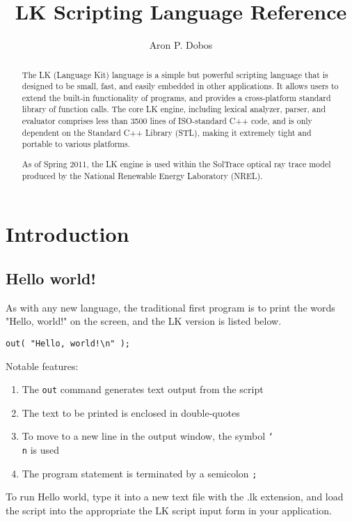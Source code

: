 \documentclass{article}
\title{LK Scripting Language Reference}
\author{Aron P. Dobos}
\newcommand\bslash{\char`\\}
\begin{document}
\maketitle
\vspace{3in}
\begin{abstract}
The LK (Language Kit) language is a simple but powerful scripting language that is designed to be small, fast, and easily embedded in other applications.  It allows users to extend the built-in functionality of programs, and provides a cross-platform standard library of function calls.  The core LK engine, including lexical analyzer, parser, and evaluator comprises less than 3500 lines of ISO-standard C++ code, and is only dependent on the Standard C++ Library (STL), making it extremely tight and portable to various platforms.

As of Spring 2011, the LK engine is used within the SolTrace optical ray trace model produced by the National Renewable Energy Laboratory (NREL).
\end{abstract} 

\newpage
\tableofcontents
\newpage
\section{Introduction}
\subsection{Hello world!}

As with any new language, the traditional first program is to print the words "Hello, world!" on the screen, and the LK version is listed below.

\begin{verbatim}
out( "Hello, world!\n" );
\end{verbatim}

Notable features:
\begin{enumerate}
\item The \texttt{out} command generates text output from the script
\item The text to be printed is enclosed in double-quotes
\item To move to a new line in the output window, the symbol \texttt{\bslash n} is used
\item The program statement is terminated by a semicolon \texttt{;}
\end{enumerate}


To run Hello world, type it into a new text file with the .lk extension, and load the script into the appropriate the LK script input form in your application.  
\end{document}

